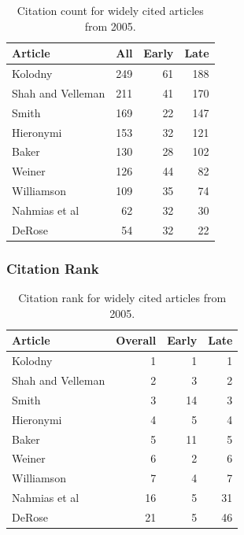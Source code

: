 \documentclass[
  10pt,
  letterpaper,
  DIV=11,
  numbers=noendperiod,
  twoside]{scrartcl}
\begin{document}
\begin{longtable}[]{@{}lrrr@{}}

\caption{\label{tbl-citation-count-2005}Citation count for widely cited
articles from 2005.}

\tabularnewline

\toprule\noalign{}
Article & All & Early & Late \\
\midrule\noalign{}
\endhead
\bottomrule\noalign{}
\endlastfoot
Kolodny & 249 & 61 & 188 \\
Shah and Velleman & 211 & 41 & 170 \\
Smith & 169 & 22 & 147 \\
Hieronymi & 153 & 32 & 121 \\
Baker & 130 & 28 & 102 \\
Weiner & 126 & 44 & 82 \\
Williamson & 109 & 35 & 74 \\
Nahmias et al & 62 & 32 & 30 \\
DeRose & 54 & 32 & 22 \\

\end{longtable}

\subsubsection*{Citation Rank}\label{sec-rank-2005}

\begin{longtable}[]{@{}lrrr@{}}

\caption{\label{tbl-citation-rank-2005}Citation rank for widely cited
articles from 2005.}

\tabularnewline

\toprule\noalign{}
Article & Overall & Early & Late \\
\midrule\noalign{}
\endhead
\bottomrule\noalign{}
\endlastfoot
Kolodny & 1 & 1 & 1 \\
Shah and Velleman & 2 & 3 & 2 \\
Smith & 3 & 14 & 3 \\
Hieronymi & 4 & 5 & 4 \\
Baker & 5 & 11 & 5 \\
Weiner & 6 & 2 & 6 \\
Williamson & 7 & 4 & 7 \\
Nahmias et al & 16 & 5 & 31 \\
DeRose & 21 & 5 & 46 \\

\end{longtable}
\end{document}
